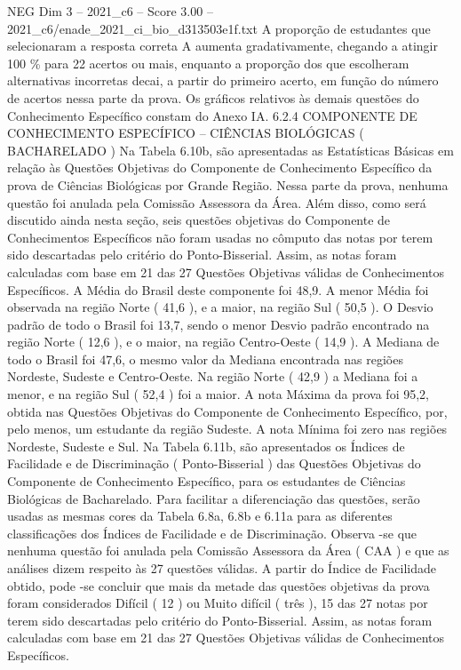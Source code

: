 \begin{textsample}{NEG Dim 3 – 2021\_c6 – Score 3.00 – 2021\_c6/enade\_2021\_ci\_bio\_d313503e1f.txt}
A proporção de estudantes que selecionaram a resposta correta A aumenta gradativamente, chegando a atingir 100 \% para 22 acertos ou mais, enquanto a proporção dos que escolheram alternativas incorretas decai, a partir do primeiro acerto, em função do número de acertos nessa parte da prova.
Os gráficos relativos às demais questões do Conhecimento Específico constam do Anexo IA. 6.2.4 COMPONENTE DE CONHECIMENTO ESPECÍFICO – CIÊNCIAS BIOLÓGICAS ( BACHARELADO ) Na Tabela 6.10b, são apresentadas as Estatísticas Básicas em relação às Questões Objetivas do Componente de Conhecimento Específico da prova de Ciências Biológicas por Grande Região.
Nessa parte da prova, nenhuma questão foi anulada pela Comissão Assessora da Área.
Além disso, como será discutido ainda nesta seção, seis questões objetivas do Componente de Conhecimentos Específicos não foram usadas no cômputo das notas por terem sido descartadas pelo critério do Ponto-Bisserial.
Assim, as notas foram calculadas com base em 21 das 27 Questões Objetivas válidas de Conhecimentos Específicos.
A Média do Brasil deste componente foi 48,9.
A menor Média foi observada na região Norte ( 41,6 ), e a maior, na região Sul ( 50,5 ).
O Desvio padrão de todo o Brasil foi 13,7, sendo o menor Desvio padrão encontrado na região Norte ( 12,6 ), e o maior, na região Centro-Oeste ( 14,9 ).
A Mediana de todo o Brasil foi 47,6, o mesmo valor da Mediana encontrada nas regiões Nordeste, Sudeste e Centro-Oeste.
Na região Norte ( 42,9 ) a Mediana foi a menor, e na região Sul ( 52,4 ) foi a maior.
A nota Máxima da prova foi 95,2, obtida nas Questões Objetivas do Componente de Conhecimento Específico, por, pelo menos, um estudante da região Sudeste.
A nota Mínima foi zero nas regiões Nordeste, Sudeste e Sul.
Na Tabela 6.11b, são apresentados os Índices de Facilidade e de Discriminação ( Ponto-Bisserial ) das Questões Objetivas do Componente de Conhecimento Específico, para os estudantes de Ciências Biológicas de Bacharelado.
Para facilitar a diferenciação das questões, serão usadas as mesmas cores da Tabela 6.8a, 6.8b e 6.11a para as diferentes classificações dos Índices de Facilidade e de Discriminação.
Observa -se que nenhuma questão foi anulada pela Comissão Assessora da Área ( CAA ) e que as análises dizem respeito às 27 questões válidas.
A partir do Índice de Facilidade obtido, pode -se concluir que mais da metade das questões objetivas da prova foram considerados Difícil ( 12 ) ou Muito difícil ( três ), 15 das 27 notas por terem sido descartadas pelo critério do Ponto-Bisserial.
Assim, as notas foram calculadas com base em 21 das 27 Questões Objetivas válidas de Conhecimentos Específicos.

\end{textsample}
